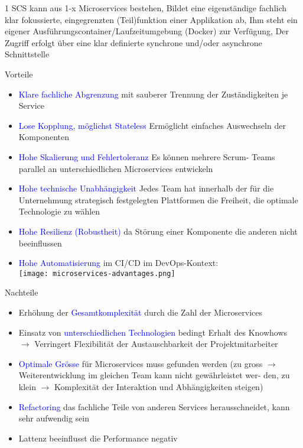 1 SCS kann aus 1-x Microservices bestehen, Bildet eine eigenständige fachlich klar fokussierte, eingegrenzten (Teil)funktion einer Applikation ab, Ihm steht ein eigener Ausführungscontainer/Laufzeitumgebung (Docker) zur Verfügung, Der Zugriff erfolgt über eine klar definierte synchrone und/oder asynchrone Schnittstelle

Vorteile
\begin{itemize}
    \item \textcolor{blue}{Klare fachliche Abgrenzung} mit sauberer Trennung der Zuständigkeiten je Service
    \item \textcolor{blue}{Lose Kopplung, möglichst Stateless} Ermöglicht einfaches Auswechseln der Komponenten
    \item \textcolor{blue}{Hohe Skalierung und Fehlertoleranz} Es können mehrere Scrum-
    Teams parallel an unterschiedlichen Microservices entwickeln
    \item \textcolor{blue}{Hohe technische Unabhängigkeit} Jedes Team hat innerhalb der für die Unternehmung strategisch festgelegten Plattformen die Freiheit, die optimale Technologie zu wählen
    \item \textcolor{blue}{Hohe Resilienz (Robustheit)} da Störung einer Komponente
    die anderen nicht beeinflussen
    \item \textcolor{blue}{Hohe Automatisierung} im CI/CD im DevOps-Kontext: \\ \texttt{[image: microservices-advantages.png]}
\end{itemize}
\vspace{10pt}
Nachteile

\begin{itemize}
    \item Erhöhung der \textcolor{blue}{Gesamtkomplexität} durch die Zahl der Microservices
    \item Einsatz von \textcolor{blue}{unterschiedlichen Technologien} bedingt Erhalt des Knowhows $\rightarrow$ Verringert Flexibilität der Austauschbarkeit der Projektmitarbeiter
    \item \textcolor{blue}{Optimale Grösse} für Microservices muss gefunden werden (zu gross $\rightarrow$ Weiterentwicklung im gleichen Team kann nicht gewährleistet wer-
    den, zu klein $\rightarrow$ Komplexität der Interaktion und Abhängigkeiten steigen)
    \item \textcolor{blue}{Refactoring} das fachliche Teile von anderen Services herausschneidet, kann sehr aufwendig sein
    \item Lattenz beeinflusst die Performance negativ
\end{itemize}

